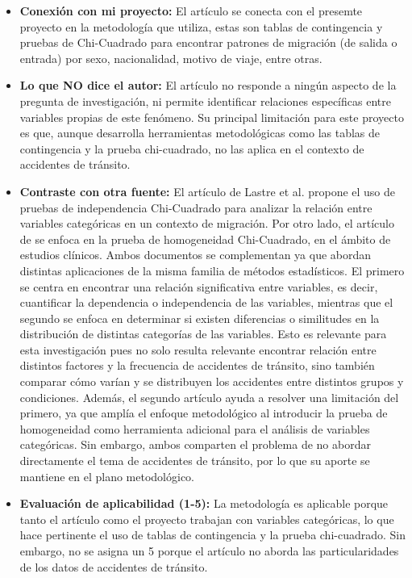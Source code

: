 \documentclass[12pt]{article}
\begin{document}
\begin{itemize}
    \item \textbf{Conexión con mi proyecto:} El artículo se conecta con el presemte proyecto en la metodología que utiliza,
    estas son tablas de contingencia y pruebas de Chi-Cuadrado para encontrar patrones de migración (de salida o entrada) 
    por sexo, nacionalidad, motivo de viaje, entre otras. 
    
	\item \textbf{Lo que NO dice el autor:} El artículo no responde a ningún aspecto de la pregunta de investigación, ni permite identificar relaciones 
    específicas entre variables propias de este fenómeno. Su principal limitación para este proyecto es que, aunque desarrolla herramientas metodológicas como 
    las tablas de contingencia y la prueba chi-cuadrado, no las aplica en el contexto de accidentes de tránsito. 
    
	\item \textbf{Contraste con otra fuente:} El artículo de Lastre et al. propone el uso de pruebas de independencia Chi-Cuadrado para analizar la relación 
    entre variables categóricas en un contexto de migración. Por otro lado, el artículo de \textcite{MONTANA2025} se enfoca en la prueba de homogeneidad 
    Chi-Cuadrado, en el ámbito de estudios clínicos. Ambos documentos se complementan ya que abordan distintas aplicaciones de la misma familia de métodos 
    estadísticos. El primero se centra en encontrar una relación significativa entre variables, es decir, cuantificar la dependencia o independencia de las 
    variables, mientras que el segundo se enfoca en determinar si existen diferencias o similitudes en la distribución de distintas categorías de las variables. 
    Esto es relevante para esta investigación pues no solo resulta relevante encontrar relación entre distintos factores y la frecuencia de accidentes de tránsito, sino 
    también comparar cómo varían y se distribuyen los accidentes entre distintos grupos y condiciones. Además, el segundo artículo ayuda a resolver una limitación 
    del primero, ya que amplía el enfoque metodológico al introducir la prueba de homogeneidad como herramienta adicional para el análisis de variables categóricas. 
    Sin embargo, ambos comparten el problema de no abordar directamente el tema de accidentes de tránsito, por lo que su aporte se mantiene en el plano metodológico.
    
	\item \textbf{Evaluación de aplicabilidad (1-5):} La metodología es aplicable porque tanto el artículo como el proyecto trabajan con variables categóricas, lo que 
    hace pertinente el uso de tablas de contingencia y la prueba chi-cuadrado.  Sin embargo, no se asigna un 5 porque el artículo no aborda las particularidades de los 
    datos de accidentes de tránsito. 
    

\end{itemize}
\end{document}
